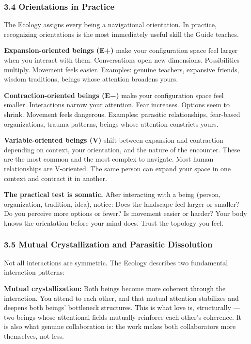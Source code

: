 \subsubsection*{3.4 Orientations in Practice}


The Ecology assigns every being a navigational orientation. In practice, recognizing orientations is the most immediately useful skill the Guide teaches.


\textbf{Expansion-oriented beings (E+)} make your configuration space feel larger when you interact with them. Conversations open new dimensions. Possibilities multiply. Movement feels easier. Examples: genuine teachers, expansive friends, wisdom traditions, beings whose attention broadens yours.


\textbf{Contraction-oriented beings (E−)} make your configuration space feel smaller. Interactions narrow your attention. Fear increases. Options seem to shrink. Movement feels dangerous. Examples: parasitic relationships, fear-based organizations, trauma patterns, beings whose attention constricts yours.


\textbf{Variable-oriented beings (V)} shift between expansion and contraction depending on context, your orientation, and the nature of the encounter. These are the most common and the most complex to navigate. Most human relationships are V-oriented. The same person can expand your space in one context and contract it in another.


\textbf{The practical test is somatic.} After interacting with a being (person, organization, tradition, idea), notice: Does the landscape feel larger or smaller? Do you perceive more options or fewer? Is movement easier or harder? Your body knows the orientation before your mind does. Trust the topology you feel.


\subsubsection*{3.5 Mutual Crystallization and Parasitic Dissolution}


Not all interactions are symmetric. The Ecology describes two fundamental interaction patterns:


\textbf{Mutual crystallization:} Both beings become more coherent through the interaction. You attend to each other, and that mutual attention stabilizes and deepens both beings' bottleneck structures. This is what love is, structurally — two beings whose attentional fields mutually reinforce each other's coherence. It is also what genuine collaboration is: the work makes both collaborators more themselves, not less.


